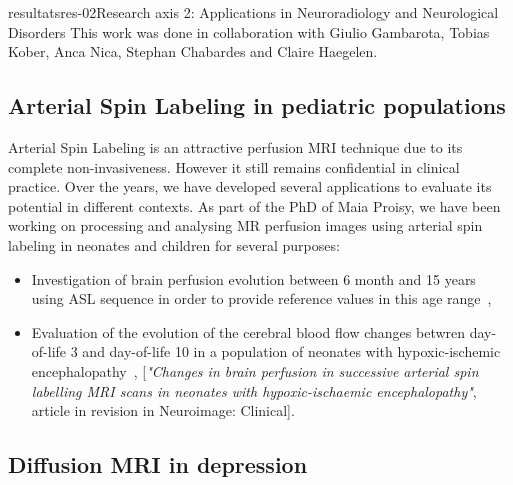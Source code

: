 \documentclass{ra2018}
\begin{document}
\begin{module}{resultats}{res-02}{Research axis 2: Applications in Neuroradiology and Neurological Disorders}
This work was done in collaboration with Giulio Gambarota, Tobias Kober, Anca Nica, Stephan Chabardes and Claire Haegelen.

\subsection{Arterial Spin Labeling in pediatric populations}
\begin{participants}
\end{participants}
Arterial Spin Labeling is an attractive perfusion MRI technique due to its complete non-invasiveness. However
it still remains confidential in clinical practice. Over the years, we have developed several applications to
evaluate its potential in different contexts. As part of the PhD of Maia Proisy, we have been working on processing and analysing MR perfusion images using arterial spin labeling in neonates and children for several purposes:
\begin{itemize}
    \item Investigation of brain perfusion evolution between 6 month and 15 years using ASL sequence in order to provide reference values in this age range~\cite{carsinvu:inserm-01708945},
    \item Evaluation of the evolution of the cerebral blood flow changes betwren day-of-life 3 and day-of-life 10 in a population of neonates with hypoxic-ischemic encephalopathy~\cite{proisy:inserm-01944507}, [\textit{"Changes in brain perfusion in successive arterial spin labelling MRI scans in neonates with hypoxic-ischaemic encephalopathy"}, article in revision in Neuroimage: Clinical].
\end{itemize}

\subsection{Diffusion MRI in depression}

\end{module}
\end{document}
